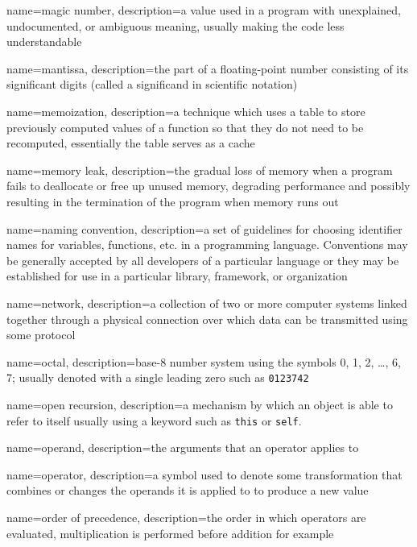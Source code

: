 {
  name=magic number,
  description={a value used in a program with unexplained, undocumented, or ambiguous meaning, usually making the code less understandable}
}

{
  name=mantissa,
  description={the part of a floating-point number consisting of its significant digits (called a significand in scientific notation)}
}

{
  name=memoization,
  description={a technique which uses a table to store previously computed values of a function so that they do not need to be recomputed, essentially the table serves as a cache}
}

{
  name=memory leak,
  description={the gradual loss of memory when a program fails to deallocate or free up unused memory, degrading performance and possibly resulting in the termination of the program when memory runs out}
}

{
  name=naming convention,
  description={a set of guidelines for choosing identifier names for variables, functions, etc. in a programming language.  Conventions may be generally accepted by all developers of a particular language or they may be established for use in a particular library, framework, or organization}
}

{
  name=network,
  description={a collection of two or more computer systems linked together through a physical connection over which data can be transmitted using some protocol}
}

{
  name=octal,
  description={base-8 number system using the symbols 0, 1, 2, \ldots, 6, 7; usually denoted with a single leading zero such as
\texttt{0123742}}
}

{
  name=open recursion,
  description={a mechanism by which an object is able to refer to itself
  usually using a keyword such as \texttt{this} or 
  \texttt{self}.}
}

{
  name=operand,
  description={the arguments that an operator applies to}
}

{
  name=operator,
  description={a symbol used to denote some transformation that combines or changes the operands it is applied to to produce a new value}
}

{
  name=order of precedence,
  description={the order in which operators are evaluated, multiplication is performed before addition for example}
}

